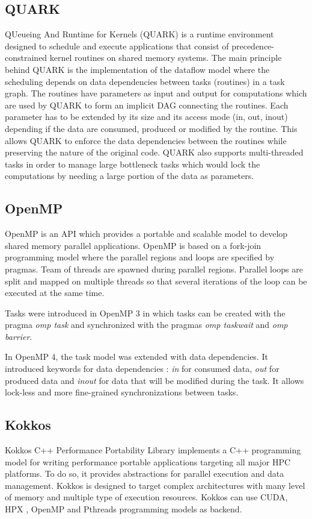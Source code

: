 \subsection{QUARK}
QUeueing And Runtime for Kernels (QUARK) \cite{YarkKD2011} is a runtime environment designed to schedule and execute applications that consist of precedence-constrained kernel routines on shared memory systems.
The main principle behind QUARK is the implementation of the dataflow model where the scheduling depends on data dependencies between tasks (routines) in a task graph.
The routines have parameters as input and output for computations which are used by QUARK to form an implicit DAG connecting the routines.
Each parameter has to be extended by its size and its access mode (in, out, inout) depending if the data are consumed, produced or modified by the routine.
This allows QUARK to enforce the data dependencies between the routines while preserving the nature of the original code.
QUARK also supports multi-threaded tasks in order to manage large bottleneck tasks which would lock the computations by needing a large portion of the data as parameters.


\subsection{OpenMP}
OpenMP \cite{DaguM1998} is an API which provides a portable and scalable model to develop shared memory parallel applications.
OpenMP is based on a fork-join programming model where the parallel regions and loops are specified by pragmas.
Team of threads are spawned during parallel regions.
Parallel loops are split and mapped on multiple threads so that several iterations of the loop can be executed at the same time.

Tasks were introduced in OpenMP 3 \cite{ACDHM2009} in which tasks can be created with the pragma \textit{omp task} and synchronized with the pragmas \textit{omp taskwait} and \textit{omp barrier}.

In OpenMP 4, the task model was extended with data dependencies.
It introduced keywords for data dependencies : \textit{in} for consumed data, \textit{out} for produced data and \textit{inout} for data that will be modified during the task.
It allows lock-less and more fine-grained synchronizations between tasks.

\subsection{Kokkos}
Kokkos C++ Performance Portability Library \cite{CarTS2014} implements a C++ programming model for writing performance portable applications targeting all major HPC platforms.
To do so, it provides abstractions for parallel execution and data management.
Kokkos is designed to target complex architectures with many level of memory and multiple type of execution resources.
Kokkos can use CUDA, HPX \cite{KHASF2014}, OpenMP \cite{DaguM1998} and Pthreads programming models as backend.

